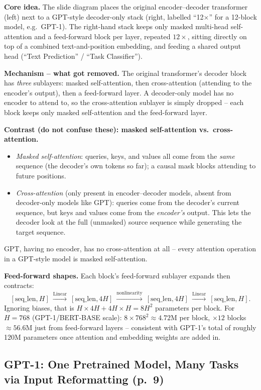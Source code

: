\documentclass[11pt]{article}
\begin{document}
\textbf{Core idea.} The slide diagram places the original encoder--decoder transformer (left) next to a GPT-style decoder-only stack (right, labelled ``12$\times$'' for a 12-block model, e.g.\ GPT-1). The right-hand stack keeps only masked multi-head self-attention and a feed-forward block per layer, repeated $12\times$, sitting directly on top of a combined text-and-position embedding, and feeding a shared output head (``Text Prediction'' / ``Task Classifier'').

\textbf{Mechanism -- what got removed.} The original transformer's decoder block has \emph{three} sublayers: masked self-attention, then cross-attention (attending to the encoder's output), then a feed-forward layer. A decoder-only model has no encoder to attend to, so the cross-attention sublayer is simply dropped -- each block keeps only masked self-attention and the feed-forward layer.

\textbf{Contrast (do not confuse these): masked self-attention vs.\ cross-attention.}
\begin{itemize}
\item \emph{Masked self-attention}: queries, keys, and values all come from the \emph{same} sequence (the decoder's own tokens so far); a causal mask blocks attending to future positions.
\item \emph{Cross-attention} (only present in encoder--decoder models, absent from decoder-only models like GPT): queries come from the decoder's current sequence, but keys and values come from the \emph{encoder's} output. This lets the decoder look at the full (unmasked) source sequence while generating the target sequence.
\end{itemize}
GPT, having no encoder, has no cross-attention at all -- every attention operation in a GPT-style model is masked self-attention.

\textbf{Feed-forward shapes.} Each block's feed-forward sublayer expands then contracts:
\[
[\text{seq\_len}, H] \ \xrightarrow{\text{Linear}}\ [\text{seq\_len}, 4H] \ \xrightarrow{\text{nonlinearity}}\ [\text{seq\_len}, 4H] \ \xrightarrow{\text{Linear}}\ [\text{seq\_len}, H].
\]
Ignoring biases, that is $H\times4H + 4H\times H = 8H^2$ parameters per block. For $H=768$ (GPT-1/BERT-BASE scale): $8\times768^2\approx4.72$M per block, $\times 12$ blocks $\approx56.6$M just from feed-forward layers -- consistent with GPT-1's total of roughly 120M parameters once attention and embedding weights are added in.

\subsection{GPT-1: One Pretrained Model, Many Tasks via Input Reformatting (p.\ 9)}
\end{document}
